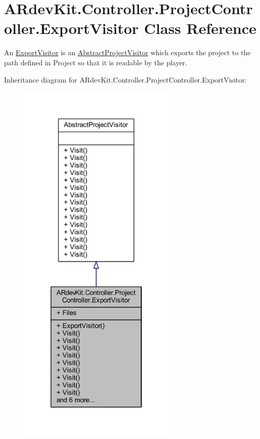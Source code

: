 \hypertarget{class_a_rdev_kit_1_1_controller_1_1_project_controller_1_1_export_visitor}{\section{A\-Rdev\-Kit.\-Controller.\-Project\-Controller.\-Export\-Visitor Class Reference}
\label{class_a_rdev_kit_1_1_controller_1_1_project_controller_1_1_export_visitor}
}


An \hyperlink{class_a_rdev_kit_1_1_controller_1_1_project_controller_1_1_export_visitor}{Export\-Visitor} is an \hyperlink{class_a_rdev_kit_1_1_controller_1_1_project_controller_1_1_abstract_project_visitor}{Abstract\-Project\-Visitor} which exports the project to the path defined in Project so that it is readable by the player.  




Inheritance diagram for A\-Rdev\-Kit.\-Controller.\-Project\-Controller.\-Export\-Visitor\-:
\nopagebreak
\begin{figure}[H]
\begin{center}
\leavevmode
\includegraphics[width=214pt]{class_a_rdev_kit_1_1_controller_1_1_project_controller_1_1_export_visitor__inherit__graph}
\end{center}
\end{figure}


